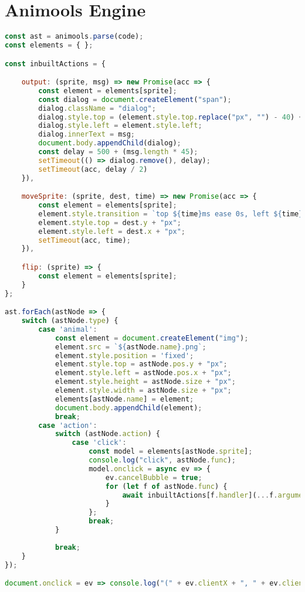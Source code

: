 \section{Animools Engine}
\begin{lstlisting}[language=JavaScript,label={app:animools:engine}, caption={Animools "engine"}]
const ast = animools.parse(code);
const elements = { };

const inbuiltActions = {

    output: (sprite, msg) => new Promise(acc => {
        const element = elements[sprite];
        const dialog = document.createElement("span");
        dialog.className = "dialog";
        dialog.style.top = (element.style.top.replace("px", "") - 40) + "px";
        dialog.style.left = element.style.left;
        dialog.innerText = msg;
        document.body.appendChild(dialog);
        const delay = 500 + (msg.length * 45);
        setTimeout(() => dialog.remove(), delay);
        setTimeout(acc, delay / 2)
    }),

    moveSprite: (sprite, dest, time) => new Promise(acc => {
        const element = elements[sprite];
        element.style.transition = `top ${time}ms ease 0s, left ${time}ms ease 0s`;
        element.style.top = dest.y + "px";
        element.style.left = dest.x + "px";
        setTimeout(acc, time);
    }),

    flip: (sprite) => {
        const element = elements[sprite];
    }
};

ast.forEach(astNode => {
    switch (astNode.type) {
        case 'animal':
            const element = document.createElement("img");
            element.src = `${astNode.name}.png`;
            element.style.position = 'fixed';
            element.style.top = astNode.pos.y + "px";
            element.style.left = astNode.pos.x + "px";
            element.style.height = astNode.size + "px";
            element.style.width = astNode.size + "px";
            elements[astNode.name] = element;
            document.body.appendChild(element);
            break;
        case 'action':
            switch (astNode.action) {
                case 'click':
                    const model = elements[astNode.sprite];
                    console.log("click", astNode.func);
                    model.onclick = async ev => {
                        ev.cancelBubble = true;
                        for (let f of astNode.func) {
                            await inbuiltActions[f.handler](...f.arguments);
                        }
                    };
                    break;
            }
            
            break;
    }
});

document.onclick = ev => console.log("(" + ev.clientX + ", " + ev.clientY + ")");
\end{lstlisting}